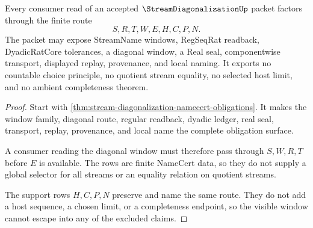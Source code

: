 \begin{theorem}
\label{thm:stream-diagonalization-window-nonescape}
Every consumer read of an accepted $\StreamDiagonalizationUp$ packet factors through the finite route
$$
S,R,T,W,E,H,C,P,N.
$$
The packet may expose StreamName windows, RegSeqRat readback, DyadicRatCore tolerances, a diagonal window, a Real seal, componentwise transport, displayed replay, provenance, and local naming. It exports no countable choice principle, no quotient stream equality, no selected host limit, and no ambient completeness theorem.
\end{theorem}
\begin{proof}
Start with \autoref{thm:stream-diagonalization-namecert-obligations}. It makes the window family, diagonal route, regular readback, dyadic ledger, real seal, transport, replay, provenance, and local name the complete obligation surface.

A consumer reading the diagonal window must therefore pass through $S,W,R,T$ before $E$ is available. The rows are finite NameCert data, so they do not supply a global selector for all streams or an equality relation on quotient streams.

The support rows $H,C,P,N$ preserve and name the same route. They do not add a host sequence, a chosen limit, or a completeness endpoint, so the visible window cannot escape into any of the excluded claims.
\end{proof}




